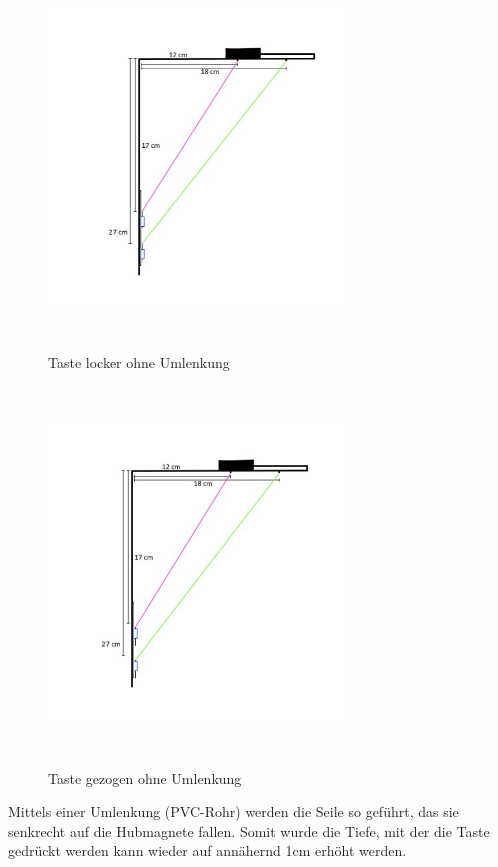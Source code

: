 \begin{enumerate}
\begin{figure}[htbp]
	\centering
	\includegraphics[width=8cm, height=10cm]{img/Umlenkung_locker}
	\caption{Taste locker ohne Umlenkung}
	\label{<label>}
\end{figure}

\begin{figure}[htbp]
	\centering
	\includegraphics[width=8cm, height=10cm]{img/Umlenkung_gezogen}
	\caption{Taste gezogen ohne Umlenkung}
	\label{<label>}
\end{figure}

Mittels einer Umlenkung (PVC-Rohr) werden die Seile so geführt, das sie senkrecht auf die Hubmagnete fallen.
Somit wurde die Tiefe, mit der die Taste gedrückt werden kann wieder auf annähernd 1cm erhöht werden.


\end{enumerate}

